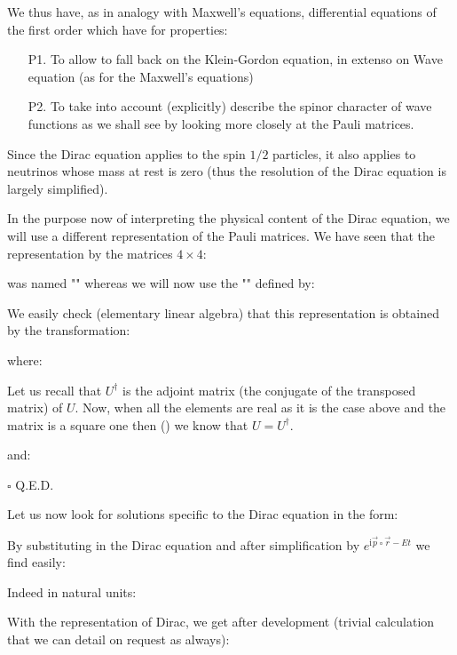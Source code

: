 	We thus have, as in analogy with Maxwell's equations, differential equations of the first order which have for properties:
	\begin{enumerate}
		\item[P1.] To allow to fall back on the Klein-Gordon equation, in extenso on Wave equation (as for the Maxwell's equations)

		\item[P2.] To take into account (explicitly) describe the spinor character of wave functions as we shall see by looking more closely at the Pauli matrices.
	\end{enumerate}
	\begin{tcolorbox}[title=Remark,colframe=black,arc=10pt]
	Since the Dirac equation applies to the spin $1/2$ particles, it also applies to neutrinos whose mass at rest is zero (thus the resolution of the Dirac equation is largely simplified).
	\end{tcolorbox}
	In the purpose now of interpreting the physical content of the Dirac equation, we will use a different representation of the Pauli matrices. We have seen that the representation by the matrices $4\times 4$:
	
	was named "" whereas we will now use the "" defined by:
	
	We easily check (elementary linear algebra) that this representation is obtained by the transformation:
	
	where:
	
	Let us recall that $U^\dagger$ is the adjoint matrix (the conjugate of the transposed matrix) of $U$. Now, when all the elements are real as it is the case above and the matrix is a square one then () we know that $U=U^\dagger$.
	\begin{dem}
	
	and:
	
	\begin{flushright}
		$\square$  Q.E.D.
	\end{flushright}
	\end{dem}
	Let us now look for solutions specific to the Dirac equation in the form:
	
	By substituting in the Dirac equation and after simplification by $e^{\mathrm{i}\vec{p}\circ\vec{r}-Et}$ we find easily:
	
	Indeed in natural units:
	
	With the representation of Dirac, we get after development (trivial calculation that we can detail on request as always):
	
